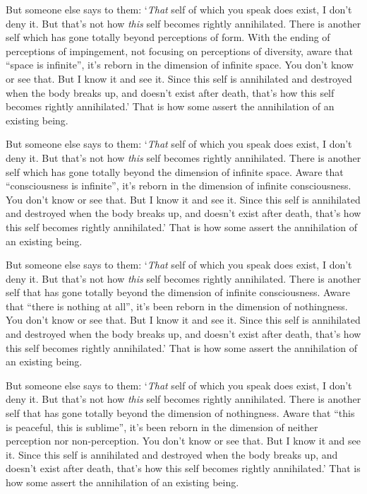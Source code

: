 \documentclass[12pt,openany]{book}%
\begin{document}
But someone else says to them: ‘\emph{That} self of which you speak does exist, I don’t deny it. But that’s not how \emph{this} self becomes rightly annihilated. There is another self which has gone totally beyond perceptions of form. With the ending of perceptions of impingement, not focusing on perceptions of diversity, aware that “space is infinite”, it’s reborn in the dimension of infinite space. You don’t know or see that. But I know it and see it. Since this self is annihilated and destroyed when the body breaks up, and doesn’t exist after death, that’s how this self becomes rightly annihilated.’ That is how some assert the annihilation of an existing being. 

But someone else says to them: ‘\emph{That} self of which you speak does exist, I don’t deny it. But that’s not how \emph{this} self becomes rightly annihilated. There is another self which has gone totally beyond the dimension of infinite space. Aware that “consciousness is infinite”, it’s reborn in the dimension of infinite consciousness. You don’t know or see that. But I know it and see it. Since this self is annihilated and destroyed when the body breaks up, and doesn’t exist after death, that’s how this self becomes rightly annihilated.’ That is how some assert the annihilation of an existing being. 

But someone else says to them: ‘\emph{That} self of which you speak does exist, I don’t deny it. But that’s not how \emph{this} self becomes rightly annihilated. There is another self that has gone totally beyond the dimension of infinite consciousness. Aware that “there is nothing at all”, it’s been reborn in the dimension of nothingness. You don’t know or see that. But I know it and see it. Since this self is annihilated and destroyed when the body breaks up, and doesn’t exist after death, that’s how this self becomes rightly annihilated.’ That is how some assert the annihilation of an existing being. 

But someone else says to them: ‘\emph{That} self of which you speak does exist, I don’t deny it. But that’s not how \emph{this} self becomes rightly annihilated. There is another self that has gone totally beyond the dimension of nothingness. Aware that “this is peaceful, this is sublime”, it’s been reborn in the dimension of neither perception nor non-perception. You don’t know or see that. But I know it and see it. Since this self is annihilated and destroyed when the body breaks up, and doesn’t exist after death, that’s how this self becomes rightly annihilated.’ That is how some assert the annihilation of an existing being. 
\end{document}
